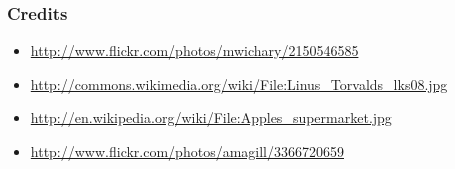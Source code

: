 \documentclass[18pt]{beamer}
\begin{document}
\begin{frame}
\frametitle{Credits}
\begin{itemize}
\item \url{http://www.flickr.com/photos/mwichary/2150546585}
\item \url{http://commons.wikimedia.org/wiki/File:Linus_Torvalds_lks08.jpg}
\item \url{http://en.wikipedia.org/wiki/File:Apples_supermarket.jpg}
\item \url{http://www.flickr.com/photos/amagill/3366720659}
\end{itemize}
\end{frame}
\end{document}
